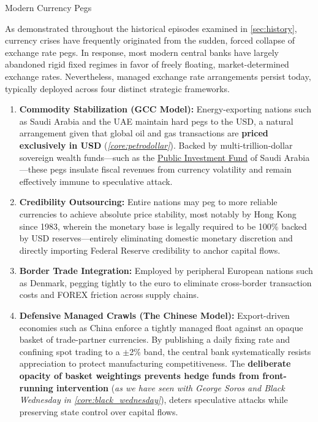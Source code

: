 \documentclass[10pt]{article}
\begin{document}
    \begin{core}[label=core:currency_pegs]{Modern Currency Pegs}

      As demonstrated throughout the historical episodes examined in \autoref{sec:history}, currency crises have frequently originated from the sudden, forced collapse of exchange rate pegs. In response, most modern central banks have largely abandoned rigid fixed regimes in favor of freely floating, market-determined exchange rates. Nevertheless, managed exchange rate arrangements persist today, typically deployed across four distinct strategic frameworks.

      \begin{enumerate}

        \item \textbf{Commodity Stabilization (GCC Model):} Energy-exporting nations such as Saudi Arabia and the UAE maintain hard pegs to the USD, a natural arrangement given that global oil and gas transactions are \textbf{priced exclusively in USD} (\textit{\autoref{core:petrodollar}}). Backed by multi-trillion-dollar sovereign wealth funds---such as the \href{https://www.pif.gov.sa/en/}{Public Investment Fund} of Saudi Arabia---these pegs insulate fiscal revenues from currency volatility and remain effectively immune to speculative attack.

        \item \textbf{Credibility Outsourcing:} Entire nations may peg to more reliable currencies to achieve absolute price stability, most notably by Hong Kong since 1983, wherein the monetary base is legally required to be 100\% backed by USD reserves---entirely eliminating domestic monetary discretion and directly importing Federal Reserve credibility to anchor capital flows.

        \item \textbf{Border Trade Integration:} Employed by peripheral European nations such as Denmark, pegging tightly to the euro to eliminate cross-border transaction costs and FOREX friction across supply chains.

        \item \textbf{Defensive Managed Crawls (The Chinese Model):} Export-driven economies such as China enforce a tightly managed float against an opaque basket of trade-partner currencies. By publishing a daily fixing rate and confining spot trading to a $\pm$2\% band, the central bank systematically resists appreciation to protect manufacturing competitiveness. The \textbf{deliberate opacity of basket weightings prevents hedge funds from front-running intervention} (\textit{as we have seen with George Soros and Black Wednesday in \autoref{core:black_wednesday}}), deters speculative attacks while preserving state control over capital flows.

      \end{enumerate}

    \end{core}
\end{document}

